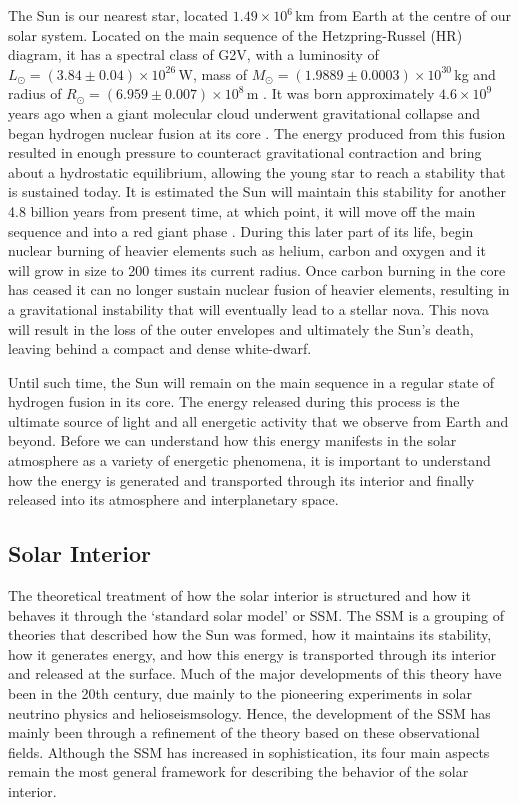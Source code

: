 The Sun is our nearest star, located $1.49\times10^6$\,km from Earth at the centre of our solar system. Located on the main sequence of the Hetzpring-Russel (HR) diagram, it has a spectral class of G2V, with a luminosity of $L_{\odot}=(3.84\pm 0.04)\times10^{26}$\,W, mass of $M_{\odot}=(1.9889\pm0.0003)\times10^{30}$\,kg and radius of $R_{\odot}=(6.959\pm0.007)\times10^8$\,m \citep{foukal2004}. It was born approximately $4.6 \times 10^9$\,years ago when a giant molecular cloud underwent gravitational collapse and began hydrogen nuclear fusion at its core \citep{montmerle2006, bouvier2010}. The energy produced from this fusion resulted in enough pressure to counteract gravitational contraction and bring about a hydrostatic equilibrium, allowing the young star to reach a stability that is sustained today. It is estimated the Sun will maintain this stability for another 4.8 billion years from present time, at which point, it will move off the main sequence and into a red giant phase \citep{sackmann1993}. During this later part of its life, begin nuclear burning of heavier elements such as helium, carbon and oxygen and it will grow in size to 200 times its current radius. Once carbon burning in the core has ceased it can no longer sustain nuclear fusion of heavier elements, resulting in a gravitational instability that will eventually lead to a stellar nova. This nova will result in the loss of the outer envelopes and ultimately the Sun's death, leaving behind a compact and dense white-dwarf.

Until such time, the Sun will remain on the main sequence in a regular state of hydrogen fusion in its core. The energy released during this process is the ultimate source of light and all energetic activity that we observe from Earth and beyond. Before we can understand how this energy manifests in the solar atmosphere as a variety of energetic phenomena, it is important to understand how the energy is generated and transported through its interior and finally released into its atmosphere and interplanetary space.

\subsection{Solar Interior}\label{sec:10}

The theoretical treatment of how the solar interior is structured and how it behaves it through the \textquoteleft standard solar model' or SSM. The SSM is a grouping of theories that described how the Sun was formed, how it maintains its stability, how it generates energy, and how this energy is transported through its interior and released at the surface. Much of the major developments of this theory have been in the 20th century, due mainly to the pioneering experiments in solar neutrino physics and helioseismsology. Hence, the development of the SSM has mainly been through a refinement of the theory based on these observational fields. Although the SSM has increased in sophistication, its four main aspects remain the most general framework for describing the behavior of the solar interior.

